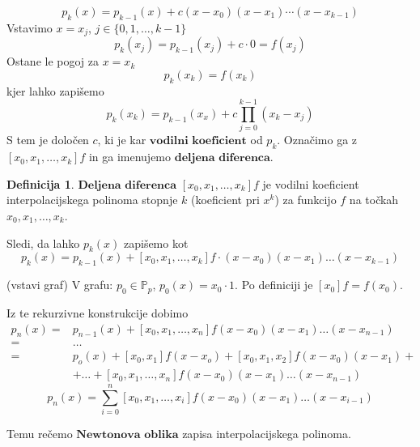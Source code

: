 \documentclass[a4paper,12pt]{article}
\theoremstyle{definition}
\newtheorem{defn}[counter]{Definicija}
\theoremstyle{remark}
\newcommand{\Pp}{\mathbb{P}}
\begin{document}
\begin{equation*}
    p_k (x) = p_{k-1}(x) + c (x-x_0)(x-x_1)\cdots(x-x_{k-1})
\end{equation*}
Vstavimo $x = x_j$, $j \in \{0, 1, \dots, k-1\}$
\begin{equation*}
    p_k(x_j) = p_{k-1}(x_j) + c \cdot 0 = f(x_j)
\end{equation*}
Ostane le pogoj za $x = x_k$
\begin{equation*}
    p_k(x_k) = f(x_k)
\end{equation*}
kjer lahko zapišemo
\begin{equation*}
    p_k(x_k) = p_{k-1}(x_x) +  c \prod_{j = 0}^{k-1}(x_k - x_j)
\end{equation*}
S tem je določen $c$, ki je kar $\textbf{vodilni koeficient}$ od $p_k$. Označimo ga z $[x_0, x_1, \dots, x_k] f$ in ga imenujemo $\textbf{deljena diferenca}$.

\begin{defn}
    $\textbf{Deljena diferenca}$  $[x_0, x_1, \dots, x_k] f$ je vodilni koeficient interpolacijskega polinoma stopnje $k$ (koeficient pri $x^k$) za funkcijo $f$ na
    točkah $x_0, x_1, \dots, x_k$.
\end{defn}

Sledi, da lahko $p_k(x)$ zapišemo kot
\begin{equation*}
    p_k(x) = p_{k-1}(x) + [x_0, x_1, \dots, x_k]f \cdot (x-x_0)(x-x_1) \dots (x-x_{k-1})
\end{equation*}

(vstavi graf)
V grafu: $p_0 \in \Pp_p$, $p_0(x) = x_0 \cdot 1$.
Po definiciji je $[x_0]f = f(x_0)$.

Iz te rekurzivne konstrukcije dobimo
\begin{align*}
    p_n(x) = & p_{n-1}(x) + [x_0, x_1, \dots, x_n] f (x-x_0)(x-x_1) \dots (x-x_{n-1}) \\
           = & \dots \\
           = & p_o(x) + [x_0, x_1] f (x-x_o) + [x_0, x_1, x_2] f (x-x_0)(x-x_1) + \\
            & + \dots + [x_0, x_1, \dots, x_n] f (x-x_0)(x-x_1) \dots (x-x_{n-1})
\end{align*}
\begin{equation*}
    p_n(x) = \sum_{i = 0}^{n}[x_0, x_1, \dots, x_i] f (x-x_0)(x-x_1)\dots(x-x_{i-1})
\end{equation*}

Temu rečemo $\textbf{Newtonova oblika}$ zapisa interpolacijskega polinoma.
\end{document}
